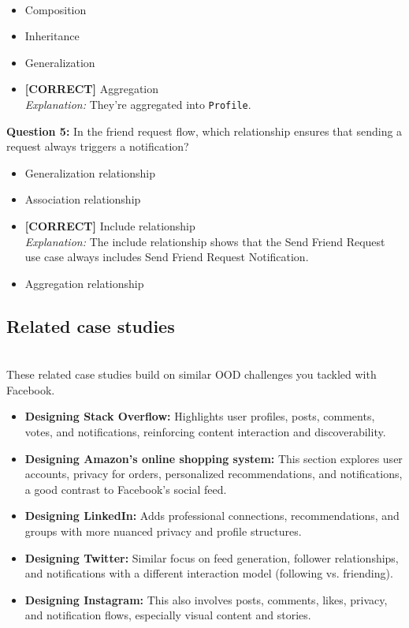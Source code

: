 \\[0.2cm]
\begin{itemize}
 \item Composition
 \item Inheritance
 \item Generalization
 \item \textbf{[CORRECT]} Aggregation
\\[0.1cm]
\textit{Explanation:} 
They're aggregated into \texttt{Profile}.
\end{itemize}
\vspace{0.3cm}
\noindent
\textbf{Question 5:} In the friend request flow, which relationship ensures that sending a request always triggers a notification?
\\[0.2cm]
\begin{itemize}
 \item Generalization relationship
 \item Association relationship
 \item \textbf{[CORRECT]} Include relationship
\\[0.1cm]
\textit{Explanation:} 
The include relationship shows that the Send Friend Request use case always includes Send Friend Request Notification.
 \item Aggregation relationship
\end{itemize}

\subsection{Related case studies}\label{Ps8dhkN0s56fiaL5m1Dvp}
\\
These related case studies build on similar OOD challenges you tackled with Facebook.

\begin{itemize}
\item
\protect{}\label{y8oYv6v1Aq11vfzkb4lFJ}
\textbf{Designing Stack Overflow:} Highlights user profiles, posts, comments, votes, and notifications, reinforcing content interaction and discoverability.
\item
\protect{}\label{R4txkhF5Eox9iB17zZkzY}
\textbf{Designing Amazon's online shopping system:} This section explores user accounts, privacy for orders, personalized recommendations, and notifications, a good contrast to Facebook's social feed.
\item
\protect{}\label{UlgC65xe5oiPdKG3wN2ey}
\textbf{Designing LinkedIn:} Adds professional connections, recommendations, and groups with more nuanced privacy and profile structures.
\item
\protect{}\label{7ZVclELh5TQwNeAkT0p9O}
\textbf{Designing Twitter:} Similar focus on feed generation, follower relationships, and notifications with a different interaction model (following vs. friending).
\item
\protect{}\label{ZC7o2G7bcrAuOYZfAA9p8}
\textbf{Designing Instagram:} This also involves posts, comments, likes, privacy, and notification flows, especially visual content and stories.
\end{itemize}

